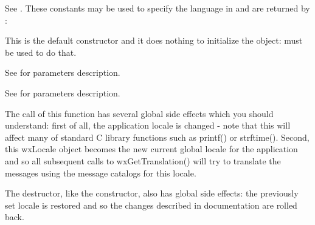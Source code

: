 \label{wxlanguage}

See .
These constants may be used to specify the language
in  and are returned by 
:


\label{wxlocaledefctor}


This is the default constructor and it does nothing to initialize the object: 
 must be used to do that.


See  for parameters description.


See  for parameters description.

The call of this function has several global side effects which you should
understand: first of all, the application locale is changed - note that this
will affect many of standard C library functions such as printf() or strftime().
Second, this wxLocale object becomes the new current global locale for the
application and so all subsequent calls to wxGetTranslation() will try to
translate the messages using the message catalogs for this locale.



\label{wxlocaledtor}


The destructor, like the constructor, also has global side effects: the previously
set locale is restored and so the changes described in 
 documentation are rolled back.


\label{wxlocaleaddcatalog}




